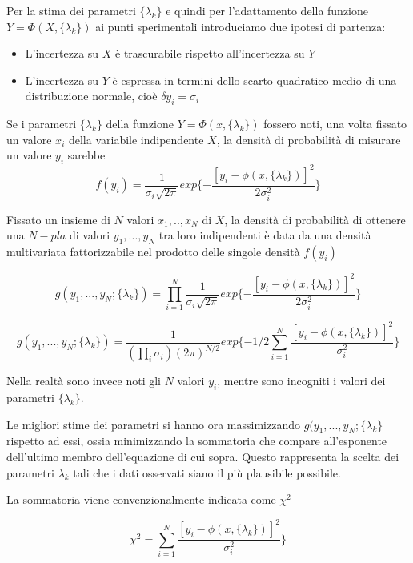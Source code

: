 \documentclass[12pt,openright,twoside,a4paper]{book}
\begin{document}
Per la stima dei parametri $\{\lambda_k\}$ e quindi per l'adattamento della funzione $Y=\Phi(X,\{\lambda_k\})$ ai punti sperimentali introduciamo due ipotesi di partenza:
\begin{itemize}
\item L'incertezza su $X$ è trascurabile rispetto all'incertezza su $Y$
\item L'incertezza su $Y$ è espressa in termini dello scarto quadratico medio di una distribuzione normale, cioè $\delta y_i=\sigma_i$
\end{itemize}

Se i parametri $\{\lambda_k\}$ della funzione $Y=\Phi(x,\{\lambda_k\})$ fossero noti, una volta fissato un valore $x_i$ della variabile indipendente $X$, la densità di probabilità di misurare un valore $y_i$ sarebbe
\begin{equation}
f(y_i)=\frac{1}{\sigma_i \sqrt{2\pi}} exp\{- \frac{[y_i - \phi(x,\{\lambda_k\})]^2}{2\sigma_i^2}\}
\end{equation}

Fissato un insieme di $N$ valori $x_1,..,x_N$ di $X$, la densità di probabilità di ottenere una $N-pla$ di valori $y_1,...,y_N$ tra loro indipendenti è data da una densità multivariata fattorizzabile nel prodotto delle singole densità $f(y_i)$

\begin{equation}
g(y_1,...,y_N;\{\lambda_k\})=\prod^{N}_{i=1}\frac{1}{\sigma_i \sqrt{2\pi}} exp\{- \frac{[y_i - \phi(x,\{\lambda_k\})]^2}{2\sigma_i^2}\}
\end{equation}

\begin{equation}
g(y_1,...,y_N;\{\lambda_k\})=\frac{1}{(\prod_{i}\sigma_i)(2\pi)^{N/2}} exp\{-1/2\sum^{N}_{i=1} \frac{[y_i - \phi(x,\{\lambda_k\})]^2}{\sigma_i^2}\}
\end{equation}


Nella realtà sono invece noti gli $N$ valori $y_i$, mentre sono incogniti i valori dei parametri $\{\lambda_k\}$.

Le migliori stime dei parametri si hanno ora massimizzando $g(y_1,...,y_N;\{\lambda_k\}$ rispetto ad essi, ossia minimizzando la sommatoria che compare all'esponente dell'ultimo membro dell'equazione di cui sopra.
Questo rappresenta la scelta dei parametri $\lambda_k$ tali che i dati osservati siano il più plausibile possibile.

La sommatoria viene convenzionalmente indicata come $\chi^2$

\begin{equation}
\chi^2=\sum^{N}_{i=1} \frac{[y_i - \phi(x,\{\lambda_k\})]^2}{\sigma_i^2}\}
\end{equation}
\end{document}
